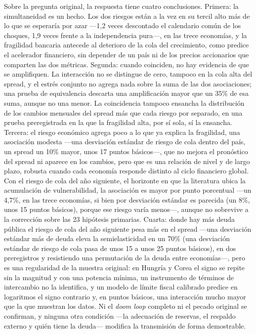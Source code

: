 Sobre la pregunta original, la respuesta tiene cuatro conclusiones. Primera: la simultaneidad es un hecho. Los dos riesgos están a la vez en su tercil alto más de lo que se esperaría por azar ---1,2 veces descontado el calendario común de los choques, 1,9 veces frente a la independencia pura---, en las trece economías, y la fragilidad bancaria antecede al deterioro de la cola del crecimiento, como predice el acelerador financiero, sin depender de un país ni de los precios accionarios que comparten las dos métricas. Segunda: cuando coinciden, no hay evidencia de que se amplifiquen. La interacción no se distingue de cero, tampoco en la cola alta del spread, y el estrés conjunto no agrega nada sobre la suma de las dos asociaciones; una prueba de equivalencia descarta una amplificación mayor que un 35\% de esa suma, aunque no una menor. La coincidencia tampoco ensancha la distribución de los cambios mensuales del spread más que cada riesgo por separado, en una prueba preregistrada en la que la fragilidad alta, por sí sola, sí la ensancha. Tercera: el riesgo económico agrega poco a lo que ya explica la fragilidad, una asociación modesta ---una desviación estándar de riesgo de cola dentro del país, un spread un 10\% mayor, unos 17 puntos básicos---, que no mejora el pronóstico del spread ni aparece en los cambios, pero que es una relación de nivel y de largo plazo, robusta cuando cada economía responde distinto al ciclo financiero global. Con el riesgo de cola del año siguiente, el horizonte en que la literatura ubica la acumulación de vulnerabilidad, la asociación es mayor por punto porcentual ---un 4,7\%, en las trece economías, si bien por desviación estándar es parecida (un 8\%, unos 15 puntos básicos), porque ese riesgo varía menos---, aunque no sobrevive a la corrección sobre las 23 hipótesis primarias. Cuarta: donde hay más deuda pública el riesgo de cola del año siguiente pesa más en el spread ---una desviación estándar más de deuda eleva la semielasticidad en un 70\% (una desviación estándar de riesgo de cola pasa de unos 15 a unos 25 puntos básicos), en dos preregistros y resistiendo una permutación de la deuda entre economías---, pero es una regularidad de la muestra original: en Hungría y Corea el signo se repite sin la magnitud y con una potencia mínima, un instrumento de términos de intercambio no la identifica, y un modelo de límite fiscal calibrado predice en logaritmos el signo contrario y, en puntos básicos, una interacción mucho mayor que la que muestran los datos. Ni el \textit{doom loop} completo ni el pecado original se confirman, y ninguna otra condición ---la adecuación de reservas, el respaldo externo y quién tiene la deuda--- modifica la transmisión de forma demostrable.

